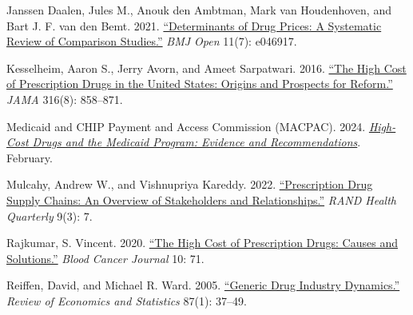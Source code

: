 \begin{singlespace}
\begin{list}{}{
    \setlength{\leftmargin}{1.5em}
    \setlength{\itemindent}{-1.5em}
    \setlength{\itemsep}{0.75\baselineskip}
    \setlength{\parsep}{0pt}
}
\item
Janssen Daalen, Jules M., Anouk den Ambtman, Mark van Houdenhoven,
and Bart J. F. van den Bemt. 2021.
\href{https://doi.org/10.1136/bmjopen-2020-046917}{``Determinants of Drug Prices: A Systematic Review of Comparison Studies.''}
\textit{BMJ Open} 11(7): e046917.

\item
Kesselheim, Aaron S., Jerry Avorn, and Ameet Sarpatwari. 2016.
\href{https://doi.org/10.1001/jama.2016.11237}{``The High Cost of Prescription Drugs in the United States: Origins and Prospects for Reform.''}
\textit{JAMA} 316(8): 858--871.

\item
Medicaid and CHIP Payment and Access Commission (MACPAC). 2024.
\href{https://www.macpac.gov/wp-content/uploads/2024/02/Policy-in-Brief-High-Cost-Drugs-FINAL-2.pdf}{\textit{High-Cost Drugs and the Medicaid Program: Evidence and Recommendations}}.
February.

\item
Mulcahy, Andrew W., and Vishnupriya Kareddy. 2022.
\href{https://www.rand.org/pubs/periodicals/health-quarterly/issues/v9/n3/07.html}{``Prescription Drug Supply Chains: An Overview of Stakeholders and Relationships.''}
\textit{RAND Health Quarterly} 9(3): 7.

\item
Rajkumar, S. Vincent. 2020.
\href{https://doi.org/10.1038/s41408-020-0338-x}{``The High Cost of Prescription Drugs: Causes and Solutions.''}
\textit{Blood Cancer Journal} 10: 71.

\item
Reiffen, David, and Michael R. Ward. 2005.
\href{https://doi.org/10.1162/0034653053327694}{``Generic Drug Industry Dynamics.''}
\textit{Review of Economics and Statistics} 87(1): 37--49.

\end{list}
\end{singlespace}
\endgroup
